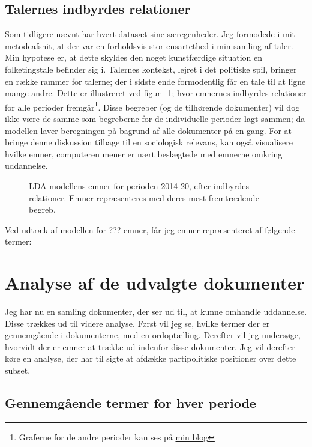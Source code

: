 \section{Talernes indbyrdes relationer}
Som tidligere nævnt har hvert datasæt sine særegenheder.
Jeg formodede i mit metodeafsnit, at der var en forholdsvis stor ensartethed i min samling af taler.
Min hypotese er, at dette skyldes den noget kunstfærdige situation en folketingstale befinder sig i.
Talernes kontekst, lejret i det politiske spil, bringer en række rammer for talerne; der i sidste ende formodentlig får en tale til at ligne mange andre.
Dette er illustreret ved figur ~\ref{fig:dendro_all}; hvor emnernes indbyrdes relationer for alle perioder fremgår\footnote{Graferne for de andre perioder kan ses på \href{martinandreasandersen.com/projects/au/}{min blog}}.
Disse begreber (og de tilhørende dokumenter) vil dog ikke være de samme som begreberne for de individuelle perioder lagt sammen; da modellen laver beregningen på bagrund af alle dokumenter på en gang.
For at bringe denne diskussion tilbage til en sociologisk relevans, kan også visualisere hvilke emner, computeren mener er nært beslægtede med emnerne omkring uddannelse.

\begin{figure}
  
  \caption{LDA-modellens emner for perioden 2014-20, efter indbyrdes relationer. Emner repræsenteres med deres mest fremtrædende begreb.}
\label{fig:dendro_all}
\end{figure}

Ved udtræk af modellen for ??? emner, får jeg emner repræsenteret af følgende termer:

\chapter{Analyse af de udvalgte dokumenter}

Jeg har nu en samling dokumenter, der ser ud til, at kunne omhandle uddannelse.
Disse trækkes ud til videre analyse.
Først vil jeg se, hvilke termer der er gennemgående i dokumenterne, med en ordoptælling.
Derefter vil jeg undersøge, hvorvidt der er emner at trække ud indenfor disse dokumenter.
Jeg vil derefter køre en analyse, der har til sigte at afdække partipolitiske positioner over dette subset.

\section{Gennemgående termer for hver periode}

